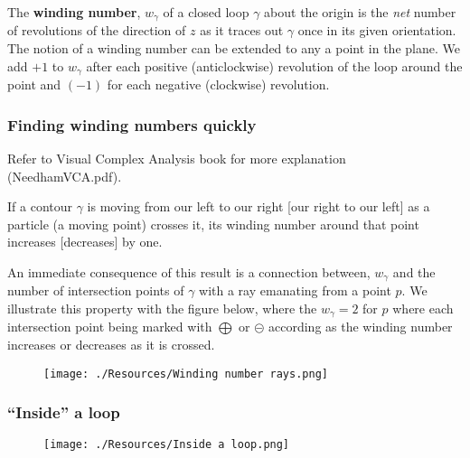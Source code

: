 \documentclass[12pt, a4paper]{article}
\begin{document}
The \textbf{winding number}, \(w_{\gamma}\) of a closed loop \(\gamma\) about the origin is the \textit{net} number of revolutions of the direction of \(z\) as it traces out \(\gamma\) once in its given orientation. The notion of a winding number can be extended to any a point in the plane. We add \(+1\) to \(w_{\gamma}\) after each positive (anticlockwise) revolution of the loop around the point and \((-1)\) for each negative (clockwise) revolution.

\subsubsection{Finding winding numbers quickly}

\begin{mdremark}
    Refer to Visual Complex Analysis book for more explanation \\ (NeedhamVCA.pdf).
\end{mdremark}

\begin{mdthm}
    If a contour \(\gamma\) is moving from our left to our right [our right to our left] as a particle (a moving point) crosses it, its winding number around that point increases [decreases] by one.
\end{mdthm}

An immediate consequence of this result is a connection between, \(w_{\gamma}\) and the number of intersection points of \(\gamma\) with a ray emanating from a point \(p\). We illustrate this property with the figure below, where the \(w_{\gamma}=2\) for \(p\) where each intersection point being marked with \(\bigoplus\) or \(\circleddash\) according as the winding number increases or decreases as it is crossed.

\begin{figure}[H]
     \begin{center}
         \texttt{[image: ./Resources/Winding number rays.png]}
     \end{center}
\end{figure}

\subsubsection{``Inside'' a loop}

\begin{figure}[H]
     \begin{center}
         \texttt{[image: ./Resources/Inside a loop.png]}
     \end{center}
\end{figure}
\end{document}
